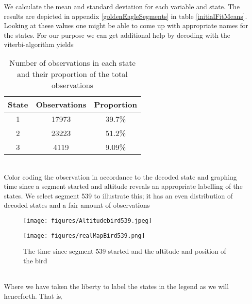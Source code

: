 We calculate the mean and standard deviation for each variable and state. The results are depicted in appendix \ref{goldenEagleSegments} in table \ref{initialFitMeans}. Looking at these values one might be able to come up with appropriate names for the states. For our purpose we can get additional help by decoding with the viterbi-algorithm yields
\begin{table}[h]
    \centering
    \begin{tabular}{ccc}
        \hline
        \textbf{State} & \textbf{Observations} & \textbf{Proportion} \\
        \hline
        1 & 17973 & 39.7\% \\
        2 & 23223 & 51.2\% \\
        3 & 4119 & 9.09\% \\
        \hline
    \end{tabular}
    \caption{Number of observations in each state and their proportion of the total observations}
    \label{estimWeight1}
\end{table}\\
Color coding the observation in accordance to the decoded state and graphing time since a segment started and altitude reveals an appropriate labelling of the states. We select segment 539 to illustrate this; it has an even distribution of decoded states and a fair amount of observations
\begin{figure}[h]
  \centering
  \begin{minipage}[b]{0.49\textwidth}
    \texttt{[image: figures/Altitudebird539.jpeg]}
  \end{minipage}
  \hfill
  \begin{minipage}[b]{0.49\textwidth}
    \texttt{[image: figures/realMapBird539.png]}
  \end{minipage}
  \caption{The time since segment 539 started and the altitude and position of the bird}
  \label{bird539}
\end{figure}\\
Where we have taken the liberty to label the states in the legend as we will henceforth. That is,
